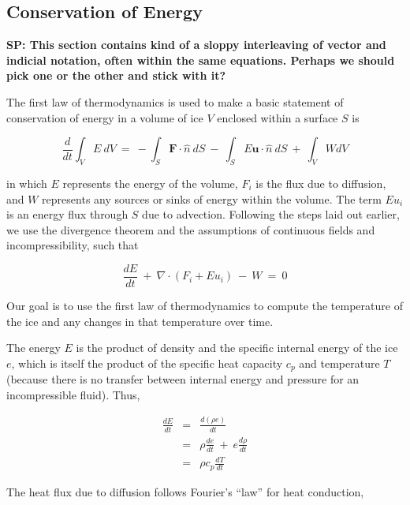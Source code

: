 \subsection{Conservation of Energy}
\textbf{SP: This section contains kind of a sloppy interleaving of vector and indicial notation, often within the same
equations. Perhaps we should pick one or the other and stick with it?}

The first law of thermodynamics is used to make a basic statement of conservation of energy in a volume of ice $V$ enclosed within a surface $S$ is

\begin{equation}
\frac{d}{d t} \int_{V}E ~dV~=~- \int_{S}\mathbf{F}\cdot \hat{n}~dS~-~\int_{S}E \mathbf{u}\cdot \hat{n}~dS~+~\int_{V}W dV
\label{eq:enbal1}
\end{equation}

in which $E$ represents the energy of the volume, $F_{i}$ is the flux due
to diffusion, and $W$ represents any sources or sinks of energy within
the volume. The term $Eu_{i}$ is an energy flux through $S$ due to advection.
Following the steps laid out earlier, we use the divergence theorem and
the assumptions of continuous fields and incompressibility, such that

\begin{equation}
\frac{dE}{dt}~+~\nabla \cdot \left(F_{i} +E u_{i}  \right)~-~W~=~0
\label{eq:enbal2}
\end{equation}

Our goal is to use the first law of thermodynamics to compute the temperature of the ice and any changes in that temperature over time.

The energy $E$ is the product of density and the specific internal
energy of the ice $e$, which is itself the product of the specific heat
capacity $c_{p}$ and temperature $T$ (because there is no transfer
between internal energy and pressure for an incompressible fluid). Thus,

\begin{equation}
\begin{matrix}
\frac{dE}{dt}&=&\frac{d\left(\rho e \right)}{dt} \\
&=&\rho\frac{de}{dt}~+~e \frac{d\rho}{dt}\\
&=&\rho c_{p} \frac{dT}{dt}
\end{matrix}
\label{eq:enbal3}
\end{equation}

The heat flux due to diffusion follows Fourier's ``law'' for heat conduction,

